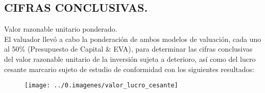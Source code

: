 \subsection{CIFRAS CONCLUSIVAS.}

Valor razonable unitario ponderado.\\

El valuador llevó a cabo la ponderación de ambos modelos de valuación, cada uno al 50\% (Presupuesto de Capital  \& EVA), para determinar las cifras conclusivas del valor razonable unitario de la inversión sujeta a deterioro, así como del lucro cesante marcario sujeto de estudio de conformidad con los siguientes resultados:

\begin{figure}
\centering
\texttt{[image: ../0.imagenes/valor\_lucro\_cesante]}
\end{figure}